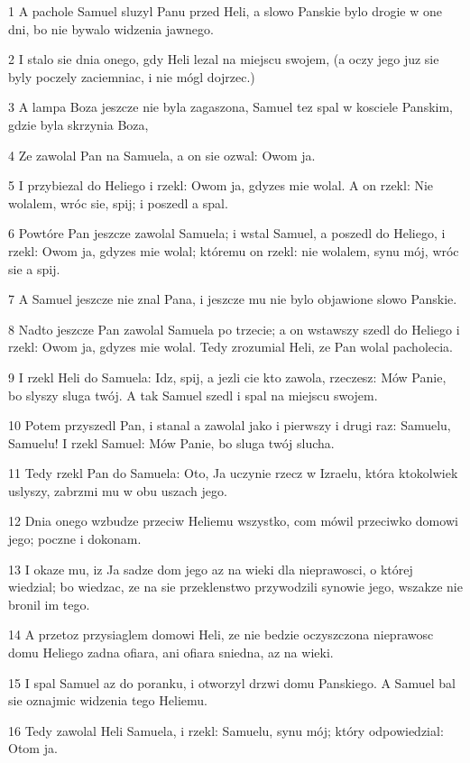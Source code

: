 \par 1 A pachole Samuel sluzyl Panu przed Heli, a slowo Panskie bylo drogie w one dni, bo nie bywalo widzenia jawnego.
\par 2 I stalo sie dnia onego, gdy Heli lezal na miejscu swojem, (a oczy jego juz sie byly poczely zaciemniac, i nie mógl dojrzec.)
\par 3 A lampa Boza jeszcze nie byla zagaszona, Samuel tez spal w kosciele Panskim, gdzie byla skrzynia Boza,
\par 4 Ze zawolal Pan na Samuela, a on sie ozwal: Owom ja.
\par 5 I przybiezal do Heliego i rzekl: Owom ja, gdyzes mie wolal. A on rzekl: Nie wolalem, wróc sie, spij; i poszedl a spal.
\par 6 Powtóre Pan jeszcze zawolal Samuela; i wstal Samuel, a poszedl do Heliego, i rzekl: Owom ja, gdyzes mie wolal; któremu on rzekl: nie wolalem, synu mój, wróc sie a spij.
\par 7 A Samuel jeszcze nie znal Pana, i jeszcze mu nie bylo objawione slowo Panskie.
\par 8 Nadto jeszcze Pan zawolal Samuela po trzecie; a on wstawszy szedl do Heliego i rzekl: Owom ja, gdyzes mie wolal. Tedy zrozumial Heli, ze Pan wolal pacholecia.
\par 9 I rzekl Heli do Samuela: Idz, spij, a jezli cie kto zawola, rzeczesz: Mów Panie, bo slyszy sluga twój. A tak Samuel szedl i spal na miejscu swojem.
\par 10 Potem przyszedl Pan, i stanal a zawolal jako i pierwszy i drugi raz: Samuelu, Samuelu! I rzekl Samuel: Mów Panie, bo sluga twój slucha.
\par 11 Tedy rzekl Pan do Samuela: Oto, Ja uczynie rzecz w Izraelu, która ktokolwiek uslyszy, zabrzmi mu w obu uszach jego.
\par 12 Dnia onego wzbudze przeciw Heliemu wszystko, com mówil przeciwko domowi jego; poczne i dokonam.
\par 13 I okaze mu, iz Ja sadze dom jego az na wieki dla nieprawosci, o której wiedzial; bo wiedzac, ze na sie przeklenstwo przywodzili synowie jego, wszakze nie bronil im tego.
\par 14 A przetoz przysiaglem domowi Heli, ze nie bedzie oczyszczona nieprawosc domu Heliego zadna ofiara, ani ofiara sniedna, az na wieki.
\par 15 I spal Samuel az do poranku, i otworzyl drzwi domu Panskiego. A Samuel bal sie oznajmic widzenia tego Heliemu.
\par 16 Tedy zawolal Heli Samuela, i rzekl: Samuelu, synu mój; który odpowiedzial: Otom ja.
